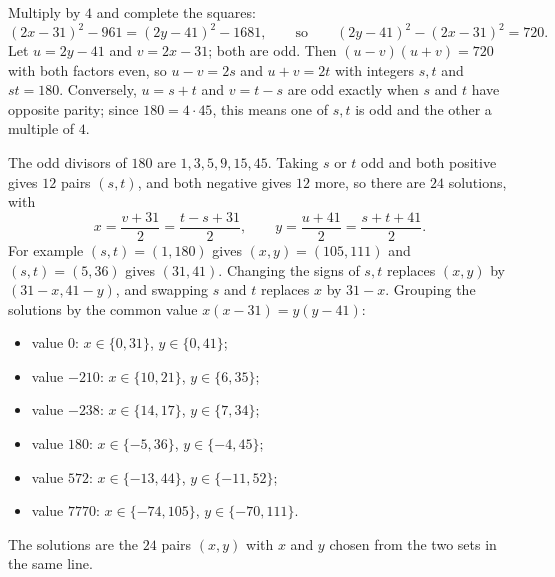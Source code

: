 Multiply by $4$ and complete the squares:
\[(2x-31)^2-961=(2y-41)^2-1681,\qquad\text{so}\qquad(2y-41)^2-(2x-31)^2=720.\]
Let $u=2y-41$ and $v=2x-31$; both are odd. Then $(u-v)(u+v)=720$ with both factors even, so $u-v=2s$ and $u+v=2t$ with integers $s,t$ and $st=180$. Conversely, $u=s+t$ and $v=t-s$ are odd exactly when $s$ and $t$ have opposite parity; since $180=4\cdot45$, this means one of $s,t$ is odd and the other a multiple of $4$.

The odd divisors of $180$ are $1,3,5,9,15,45$. Taking $s$ or $t$ odd and both positive gives $12$ pairs $(s,t)$, and both negative gives $12$ more, so there are $24$ solutions, with
\[x=\dfrac{v+31}2=\dfrac{t-s+31}{2},\qquad y=\dfrac{u+41}{2}=\dfrac{s+t+41}{2}.\]
For example $(s,t)=(1,180)$ gives $(x,y)=(105,111)$ and $(s,t)=(5,36)$ gives $(31,41)$. Changing the signs of $s,t$ replaces $(x,y)$ by $(31-x,41-y)$, and swapping $s$ and $t$ replaces $x$ by $31-x$. Grouping the solutions by the common value $x(x-31)=y(y-41)$:
\begin{itemize}
\item value $0$: $x\in\{0,31\}$, $y\in\{0,41\}$;
\item value $-210$: $x\in\{10,21\}$, $y\in\{6,35\}$;
\item value $-238$: $x\in\{14,17\}$, $y\in\{7,34\}$;
\item value $180$: $x\in\{-5,36\}$, $y\in\{-4,45\}$;
\item value $572$: $x\in\{-13,44\}$, $y\in\{-11,52\}$;
\item value $7770$: $x\in\{-74,105\}$, $y\in\{-70,111\}$.
\end{itemize}
The solutions are the $\boxed{24}$ pairs $(x,y)$ with $x$ and $y$ chosen from the two sets in the same line.
